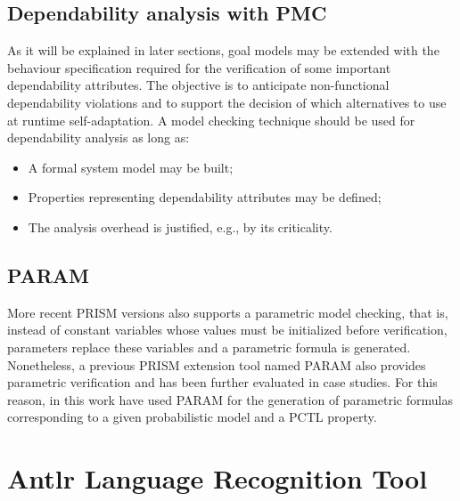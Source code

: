 \subsection{Dependability analysis with PMC}

As it will be explained in later sections, goal models may be extended with the behaviour specification required for the verification of some important dependability attributes. The objective is to anticipate non-functional dependability violations and to support the decision of which alternatives to use at runtime self-adaptation. A model checking technique should be used for dependability analysis as long as: 

\begin{itemize}

\item A formal system model may be built;
\medskip

\item Properties representing dependability attributes may be defined;
\medskip

\item The analysis overhead is justified, e.g., by its criticality.
\bigskip

\end{itemize}

\subsection{PARAM}

More recent PRISM versions also supports a parametric model checking, that is, instead of constant variables whose values must be initialized before verification, parameters replace these variables and a parametric formula is generated. Nonetheless, a previous PRISM extension tool named PARAM also provides parametric verification and has been further evaluated in case studies. For this reason, in this work have used PARAM for the generation of parametric formulas corresponding to a given probabilistic model and a PCTL property.


\section{Antlr Language Recognition Tool}

